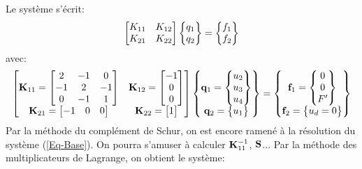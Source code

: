 Le système s'écrit:
\begin{equation}
\MM*{K_{11} & K_{12}\\ K_{21} & K_{22}}
\VV*{q_1\\ q_2} =
\VV*{f_1\\ f_2}
\end{equation}
avec:
\begin{equation*}
\MM*{%
\MM{K}_{11}=\MM*{2 & -1 & 0 \\ -1 & 2 & -1\\ 0 & -1 & 1} &
\MM{K}_{12}=\MM*{-1 \\ 0\\ 0}\\
\MM{K}_{21}=\MM*{-1 & 0 & 0} &
\MM{K}_{22} =\MM*{1}
}
\VV*{\VV{q}_1=\VV*{u_2\\u_3\\u_4}\\
\VV{q}_2 =\VV*{u_1}}
=
\VV*{\VV{f}_1 =\VV*{0\\0\\F'}\\ 
\VV{f}_2=\VV*{u_d=0}}
\end{equation*}
\medskipvm
Par la méthode du complément de Schur, on est encore ramené à la résolution du système (\ref{Eq-Base}).
On pourra s'amuser à calculer $\MM{K}_{11}^{-1}$, $\MM{S}$...
\medskipvm
Par la méthode des multiplicateurs de Lagrange, on obtient le système:
